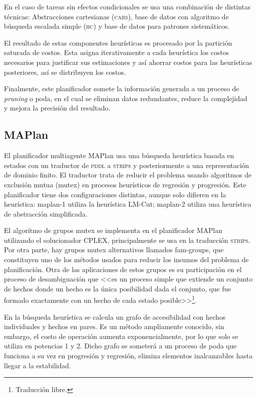 \documentclass[a4paper,12pt,twocolumn]{article}
\begin{document}
En el caso de tareas sin efectos condicionales se usa una combinación de distintas técnicas: Abstracciones cartesianas (\textsc{cars}), base de datos con algoritmo de búsqueda escalada simple (\textsc{hc}) y  base de datos para patrones sistemáticos.

El resultado de estas componentes heurísticas es procesado por la partición saturada de costos. Esta asigna iterativamente a cada heurística los costos necesarios para justificar sus estimaciones y así ahorrar costos para las heurísticas posteriores, así se distribuyen los costos.

Finalmente, este planificador somete la información generada a un proceso de \emph{pruning} o poda, en el cual se eliminan datos redundantes, reduce la complejidad y mejora la precisión del resultado.

\subsection{MAPlan}
\label{sec:maplan}

El planificador multiagente MAPlan\citep{fiser2018maplan} usa una búsqueda heurística basada en estados con un traductor de \textsc{pddl} a \textsc{strips} y posteriormente a una representación de dominio finito. El traductor trata de reducir el problema usando algoritmos de exclusión mutua (mutex) en procesos heurísticos de regresión y progresión. Este planificador tiene dos configuraciones distintas, aunque solo difieren en la heurística: maplan-1 utiliza la heurística LM-Cut; maplan-2 utiliza una heurística de abstracción simplificada.

El algoritmo de grupos mutex se implementa en el planificador MAPlan utilizando el solucionador CPLEX, principalmente se usa en la traducción \textsc{strips}. Por otra parte, hay grupos mutex alternativos llamados fam-groups, que constituyen uno de los métodos usados para reducir los insumos del problema de planificación. Otra de las aplicaciones de estos grupos es su participación en el proceso de desambiguación que <<es un proceso simple que extiende un conjunto de hechos donde un  hecho  es la única posibilidad dada el conjunto, que fue formado exactamente con un hecho de cada estado posible>>\footnote{Traducción libre.}\citep{fiser2018maplan}.

En la búsqueda heurística se calcula un grafo de accesibilidad con hechos individuales y hechos en pares. Es un método ampliamente conocido, sin embargo, el costo de operación aumenta exponencialmente, por lo que solo se utiliza en potencias 1 y 2. Dicho grafo se someterá a un proceso de poda que funciona a su vez en progresión y regresión, elimina elementos inalcanzables hasta llegar a la estabilidad. 
\end{document}
